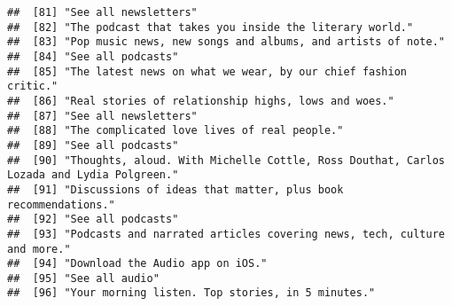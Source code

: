 \documentclass[
]{article}
\begin{document}
\begin{verbatim}
##  [81] "See all newsletters"                                                                                                                                      
##  [82] "The podcast that takes you inside the literary world."                                                                                                    
##  [83] "Pop music news, new songs and albums, and artists of note."                                                                                               
##  [84] "See all podcasts"                                                                                                                                         
##  [85] "The latest news on what we wear, by our chief fashion critic."                                                                                            
##  [86] "Real stories of relationship highs, lows and woes."                                                                                                       
##  [87] "See all newsletters"                                                                                                                                      
##  [88] "The complicated love lives of real people."                                                                                                               
##  [89] "See all podcasts"                                                                                                                                         
##  [90] "Thoughts, aloud. With Michelle Cottle, Ross Douthat, Carlos Lozada and Lydia Polgreen."                                                                   
##  [91] "Discussions of ideas that matter, plus book recommendations."                                                                                             
##  [92] "See all podcasts"                                                                                                                                         
##  [93] "Podcasts and narrated articles covering news, tech, culture and more."                                                                                    
##  [94] "Download the Audio app on iOS."                                                                                                                           
##  [95] "See all audio"                                                                                                                                            
##  [96] "Your morning listen. Top stories, in 5 minutes."                                                                                                          

\end{verbatim}
\end{document}

